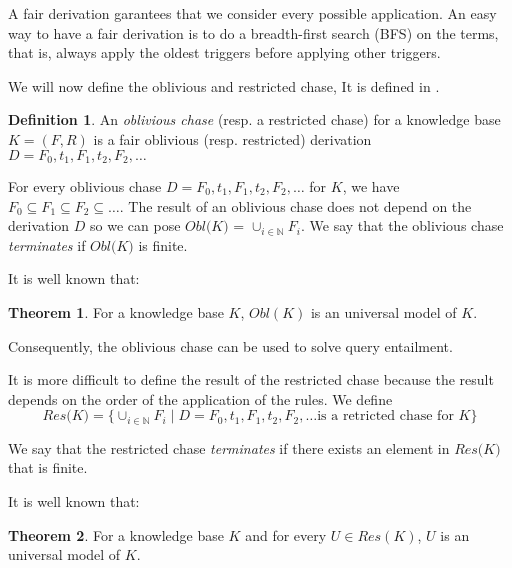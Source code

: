 \documentclass{article}
\theoremstyle{definition}
\newtheorem{definition}{Definition}[section]
\newtheorem{theorem}{Theorem}[section]
\theoremstyle{remark}
\def \N {\mathbb N}
\begin{document}
A fair derivation garantees that we consider every possible application. An easy way to have a fair derivation is to do a breadth-first search (BFS) on the terms, that is, always apply the oldest triggers before applying other triggers.

We will now define the oblivious and restricted chase, It is defined in \cite{obl_res}.


\begin{definition}
An \emph{oblivious chase} (resp. a restricted chase) for a knowledge base $K= (F,R)$ is a fair oblivious (resp. restricted) derivation $D=F_0,t_1,F_1,t_2,F_2,\ldots$ 
\end{definition}

For every oblivious chase $D = F_0,t_1,F_1,t_2,F_2,\ldots$ for $K$, we have $F_0 \subseteq F_1 \subseteq F_2 \subseteq \ldots$. The result of an oblivious chase does not depend on the derivation $D$ so we can pose \emph{$\textit{Obl(K)}$} = $\cup_{i \in \N}F_i$. We say that the oblivious chase \emph{terminates} if $\textit{Obl(K)}$ is finite.

It is well known that:

\begin{theorem}
For a knowledge base $K$, $\textit{Obl}(K)$ is an universal model of $K$.
\end{theorem}

Consequently, the oblivious chase can be used to solve query entailment.

It is more difficult to define the result of the restricted chase because the result depends on the order of the application of the rules. We define $$\textit{Res(K)}=\{\cup_{i \in \N}F_i \mid D = F_0,t_1,F_1,t_2,F_2,\ldots \text{is a retricted chase for } K\}$$

We say that the restricted chase \emph{terminates} if there exists an element in $\textit{Res(K)}$ that is finite.

It is well known that:

\begin{theorem}
For a knowledge base $K$ and for every $U \in \textit{Res}(K)$, $U$ is an universal model of $K$.
\end{theorem}
\end{document}
